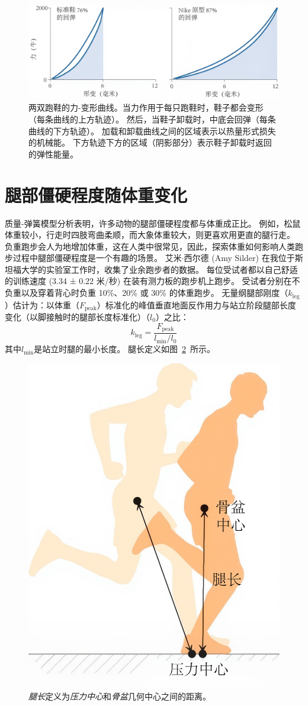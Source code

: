 \begin{figure}[!htb]
	\centering
	\includegraphics[width=1.0\linewidth]{chap3/3_14}
	\caption{两双跑鞋的力-变形曲线。当力作用于每只跑鞋时，鞋子都会变形（每条曲线的上方轨迹）。
		然后，当鞋子卸载时，中底会回弹（每条曲线的下方轨迹）。
		加载和卸载曲线之间的区域表示以热量形式损失的机械能。
		下方轨迹下方的区域（阴影部分）表示鞋子卸载时返回的弹性能量\cite{hoogkamer2018comparison}。 \label{fig:3_14}}
\end{figure}


\section{腿部僵硬程度随体重变化}

质量-弹簧模型分析表明，许多动物的腿部僵硬程度都与体重成正比\cite{farley1993running}。
例如，松鼠体重较小，行走时四肢弯曲柔顺，而大象体重较大，则更喜欢用更直的腿行走。
负重跑步会人为地增加体重，这在人类中很常见，因此，探索体重如何影响人类跑步过程中腿部僵硬程度是一个有趣的场景。
艾米$\cdot$西尔德 (Amy Silder) 在我位于斯坦福大学的实验室工作时，收集了业余跑步者的数据。
每位受试者都以自己舒适的训练速度 (3.34 ± 0.22 米/秒) 在装有测力板的跑步机上跑步。
受试者分别在不负重以及穿着背心时负重 10\%、20\% 或 30\% 的体重跑步。
无量纲腿部刚度（$k_\text{leg}$）估计为：以体重（$F_\text{peak}$）标准化的峰值垂直地面反作用力与站立阶段腿部长度变化（以脚接触时的腿部长度标准化）（$l_0$）之比：
%
\begin{equation}
	k_\text{leg} = \frac{F_\text{peak}}{l_\text{min} / l_0 }
\end{equation}
%
其中$l_\text{min}$是站立时腿的最小长度。
腿长定义如图~\ref{fig:3_15}~所示。

\begin{figure}[!htb]
	\centering
	\includegraphics[width=0.4\linewidth]{chap3/3_15}
	\caption{\textit{腿长}定义为\textit{压力中心}和\textit{骨盆}几何中心之间的距离。 \label{fig:3_15}}
\end{figure}

